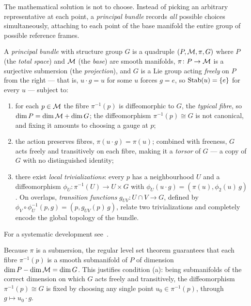 The mathematical solution is not to choose. Instead of picking an arbitrary
representative at each point, a \emph{principal bundle} records \emph{all}
possible choices simultaneously, attaching to each point of the base manifold
the entire group of possible reference frames.

\begin{definition}
\label{def:gauge:principal-bundle}
A \emph{principal bundle} with structure group $G$ is a quadruple
$(P, \mathcal{M}, \pi, G)$ where $P$ (the \emph{total space}) and $\mathcal{M}$ (the
\emph{base}) are smooth manifolds, $\pi\colon P \to \mathcal{M}$ is a surjective
submersion (the \emph{projection}), and $G$ is a Lie group acting \emph{freely}
on $P$ from the right --- that is, $u \cdot g = u$ for some $u$ forces $g = e$,
so $\operatorname{Stab}(u) = \{e\}$ for every $u$ --- subject to:
\begin{enumerate}
  \item[(a)] for each $p \in \mathcal{M}$ the fibre $\pi^{-1}(p)$ is diffeomorphic to
    $G$, the \emph{typical fibre}, so $\dim P = \dim \mathcal{M} + \dim G$; the
    diffeomorphism $\pi^{-1}(p) \cong G$ is not canonical, and fixing it amounts
    to choosing a gauge at $p$;
  \item[(b)] the action preserves fibres, $\pi(u \cdot g) = \pi(u)$; combined
    with freeness, $G$ acts freely and transitively on each fibre, making it a
    \emph{torsor} of $G$ --- a copy of $G$ with no distinguished identity;
  \item[(c)] there exist \emph{local trivializations}: every $p$ has a
    neighbourhood $U$ and a diffeomorphism $\phi_U\colon \pi^{-1}(U) \to U \times
    G$ with $\phi_U(u \cdot g) = (\pi(u), \phi_2(u)\, g)$. On overlaps,
    \emph{transition functions} $g_{UV}\colon U \cap V \to G$, defined by
    $\phi_V \circ \phi_U^{-1}(p, g) = (p, g_{UV}(p)\, g)$, relate two
    trivializations and completely encode the global topology of the bundle.
\end{enumerate}
For a systematic development see~\citep{Kobayashi1996}.
\end{definition}

\begin{remark}
\label{rem:gauge:fibres-submanifold}
Because $\pi$ is a submersion, the regular level set theorem guarantees that each
fibre $\pi^{-1}(p)$ is a smooth submanifold of $P$ of dimension
$\dim P - \dim \mathcal{M} = \dim G$. This justifies condition (a): being submanifolds
of the correct dimension on which $G$ acts freely and transitively, the
diffeomorphism $\pi^{-1}(p) \cong G$ is fixed by choosing any single point
$u_0 \in \pi^{-1}(p)$, through $g \mapsto u_0 \cdot g$.
\end{remark}

